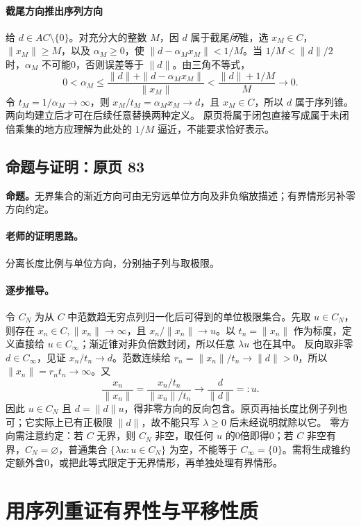 \paragraph{截尾方向推出序列方向}
给 $d\in AC\setminus\{0\}$。对充分大的整数 $M$，因 $d$ 属于截尾\emph{闭}锥，选 $x_M\in C$，$\|x_M\|\ge M$，以及 $\alpha_M\ge0$，使 $\|d-\alpha_Mx_M\|<1/M$。当 $1/M<\|d\|/2$ 时，$\alpha_M$ 不可能0，否则误差等于 $\|d\|$。由三角不等式，
\[0<\alpha_M\le\frac{\|d\|+\|d-\alpha_Mx_M\|}{\|x_M\|}<\frac{\|d\|+1/M}{M}\to0.\]
令 $t_M=1/\alpha_M\to\infty$，则 $x_M/t_M=\alpha_Mx_M\to d$，且 $x_M\in C$，所以 $d$ 属于序列锥。两向均建立后才可在后续任意替换两种定义。
原页将属于闭包直接写成属于未闭倍乘集的地方应理解为此处的 $1/M$ 逼近，不能要求恰好表示。


\subsection{命题与证明：原页 83}

\textbf{命题。}无界集合的渐近方向可由无穷远单位方向及非负缩放描述；有界情形另补零方向约定。

\paragraph{老师的证明思路。}分离长度比例与单位方向，分别抽子列与取极限。

\paragraph{逐步推导。}
令 $C_N$ 为从 $C$ 中范数趋无穷点列归一化后可得到的单位极限集合。先取 $u\in C_N$，则存在 $x_n\in C,\|x_n\|\to\infty$，且 $x_n/\|x_n\|\to u$。以 $t_n=\|x_n\|$ 作为标度，定义直接给 $u\in C_\infty$；渐近锥对非负倍数封闭，所以任意 $\lambda u$ 也在其中。
反向取非零 $d\in C_\infty$，见证 $x_n/t_n\to d$。范数连续给 $r_n=\|x_n\|/t_n\to\|d\|>0$，所以 $\|x_n\|=r_nt_n\to\infty$。又
\[\frac{x_n}{\|x_n\|}=\frac{x_n/t_n}{\|x_n\|/t_n}\longrightarrow\frac d{\|d\|}=:u.\]
因此 $u\in C_N$ 且 $d=\|d\|u$，得非零方向的反向包含。原页再抽长度比例子列也可；它实际上已有正极限 $\|d\|$，故不能只写 $\lambda\ge0$ 后未经说明就除以它。
零方向需注意约定：若 $C$ 无界，则 $C_N$ 非空，取任何 $u$ 的0倍即得0；若 $C$ 非空有界，$C_N=\varnothing$，普通集合 $\{\lambda u:u\in C_N\}$ 为空，不能等于 $C_\infty=\{0\}$。需将生成锥约定额外含0，或把此等式限定于无界情形，再单独处理有界情形。


\clearpage\section{用序列重证有界性与平移性质}\label{g:109:84}

